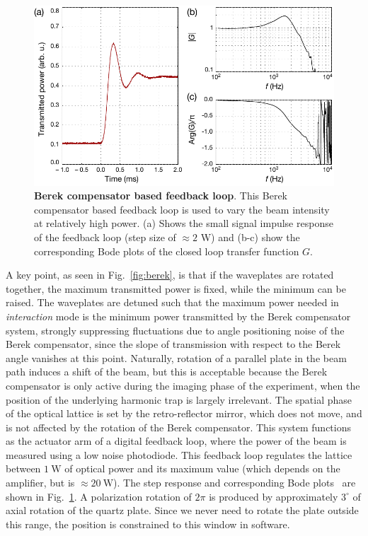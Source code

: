 \documentclass[twocolumn,aip,rsi,reprint,bibnotes]{revtex4-1}
\newcommand\unit[2]{\ensuremath{#1~\mathrm{{#2}}}}
\begin{document}
\begin{figure}
  \begin{center}
    \includegraphics[width=\columnwidth]{Figure5.pdf}
    \caption{\textbf{Berek compensator based feedback loop}. This Berek compensator based feedback loop is used to vary the beam intensity at relatively high power. (a) Shows the small signal impulse response of the feedback loop (step size of $\approx 2$ W) and (b-c) show the corresponding Bode plots of the closed loop transfer function $G$.}\label{fig:berek_step_response}
  \end{center}
\end{figure}
A key point, as seen in Fig.~\ref{fig:berek}, is that if the waveplates are rotated together, the maximum transmitted power is fixed, while the minimum can be raised.
The waveplates are detuned such that the maximum power needed in \emph{interaction} mode is the minimum power transmitted by the Berek compensator system, strongly suppressing fluctuations due to angle positioning noise of the Berek compensator, since the slope of transmission with respect to the Berek angle vanishes at this point.
Naturally, rotation of a parallel plate in the beam path induces a shift of the beam, but this is acceptable because the Berek compensator is only active during the imaging phase of the experiment, when the position of the underlying harmonic trap is largely irrelevant.
The spatial phase of the optical lattice is set by the retro-reflector mirror, which does not move, and is not affected by the rotation of the Berek compensator.
This system functions as the actuator arm of a digital feedback loop, where the power of the beam is measured using a low noise photodiode. This feedback loop regulates the lattice between \unit{1}{W} of optical power and its maximum value (which depends on the amplifier, but is $\approx$\unit{20}{W}).
The step response and corresponding Bode plots~\cite{Bechhoefer2005} are shown in Fig.~\ref{fig:berek_step_response}.
A polarization rotation of $2 \pi$ is produced by approximately $3^\circ$ of axial rotation of the quartz plate.
Since we never need to rotate the plate outside this range, the position is constrained to this window in software.
\end{document}
